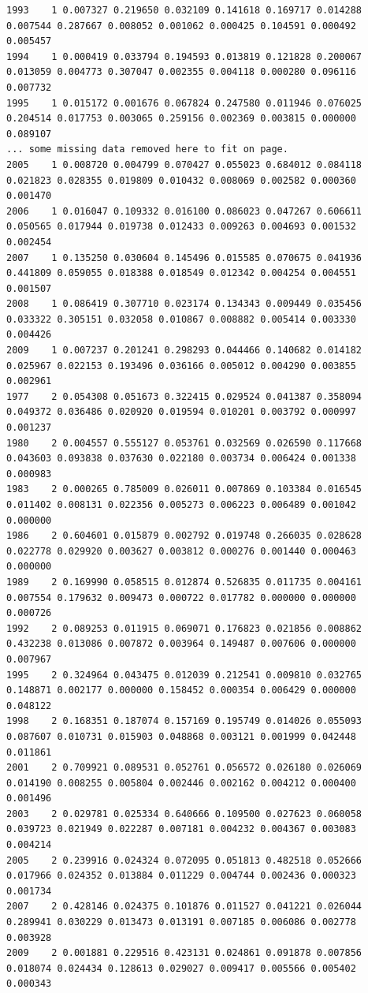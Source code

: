 \begin{landscape}
\begin{table}
\begin{scriptsize}
\begin{verbatim}
1993    1 0.007327 0.219650 0.032109 0.141618 0.169717 0.014288 0.007544 0.287667 0.008052 0.001062 0.000425 0.104591 0.000492 0.005457
1994    1 0.000419 0.033794 0.194593 0.013819 0.121828 0.200067 0.013059 0.004773 0.307047 0.002355 0.004118 0.000280 0.096116 0.007732
1995    1 0.015172 0.001676 0.067824 0.247580 0.011946 0.076025 0.204514 0.017753 0.003065 0.259156 0.002369 0.003815 0.000000 0.089107
...	some missing data removed here to fit on page.
2005    1 0.008720 0.004799 0.070427 0.055023 0.684012 0.084118 0.021823 0.028355 0.019809 0.010432 0.008069 0.002582 0.000360 0.001470
2006    1 0.016047 0.109332 0.016100 0.086023 0.047267 0.606611 0.050565 0.017944 0.019738 0.012433 0.009263 0.004693 0.001532 0.002454
2007    1 0.135250 0.030604 0.145496 0.015585 0.070675 0.041936 0.441809 0.059055 0.018388 0.018549 0.012342 0.004254 0.004551 0.001507
2008    1 0.086419 0.307710 0.023174 0.134343 0.009449 0.035456 0.033322 0.305151 0.032058 0.010867 0.008882 0.005414 0.003330 0.004426
2009    1 0.007237 0.201241 0.298293 0.044466 0.140682 0.014182 0.025967 0.022153 0.193496 0.036166 0.005012 0.004290 0.003855 0.002961
1977    2 0.054308 0.051673 0.322415 0.029524 0.041387 0.358094 0.049372 0.036486 0.020920 0.019594 0.010201 0.003792 0.000997 0.001237
1980    2 0.004557 0.555127 0.053761 0.032569 0.026590 0.117668 0.043603 0.093838 0.037630 0.022180 0.003734 0.006424 0.001338 0.000983
1983    2 0.000265 0.785009 0.026011 0.007869 0.103384 0.016545 0.011402 0.008131 0.022356 0.005273 0.006223 0.006489 0.001042 0.000000
1986    2 0.604601 0.015879 0.002792 0.019748 0.266035 0.028628 0.022778 0.029920 0.003627 0.003812 0.000276 0.001440 0.000463 0.000000
1989    2 0.169990 0.058515 0.012874 0.526835 0.011735 0.004161 0.007554 0.179632 0.009473 0.000722 0.017782 0.000000 0.000000 0.000726
1992    2 0.089253 0.011915 0.069071 0.176823 0.021856 0.008862 0.432238 0.013086 0.007872 0.003964 0.149487 0.007606 0.000000 0.007967
1995    2 0.324964 0.043475 0.012039 0.212541 0.009810 0.032765 0.148871 0.002177 0.000000 0.158452 0.000354 0.006429 0.000000 0.048122
1998    2 0.168351 0.187074 0.157169 0.195749 0.014026 0.055093 0.087607 0.010731 0.015903 0.048868 0.003121 0.001999 0.042448 0.011861
2001    2 0.709921 0.089531 0.052761 0.056572 0.026180 0.026069 0.014190 0.008255 0.005804 0.002446 0.002162 0.004212 0.000400 0.001496
2003    2 0.029781 0.025334 0.640666 0.109500 0.027623 0.060058 0.039723 0.021949 0.022287 0.007181 0.004232 0.004367 0.003083 0.004214
2005    2 0.239916 0.024324 0.072095 0.051813 0.482518 0.052666 0.017966 0.024352 0.013884 0.011229 0.004744 0.002436 0.000323 0.001734
2007    2 0.428146 0.024375 0.101876 0.011527 0.041221 0.026044 0.289941 0.030229 0.013473 0.013191 0.007185 0.006086 0.002778 0.003928
2009    2 0.001881 0.229516 0.423131 0.024861 0.091878 0.007856 0.018074 0.024434 0.128613 0.029027 0.009417 0.005566 0.005402 0.000343
\end{verbatim}
\end{scriptsize}
\end{table}
\end{landscape}


